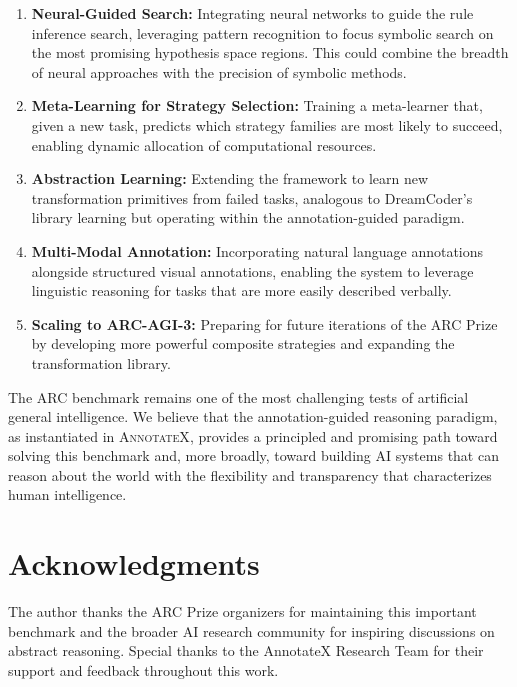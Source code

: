 \documentclass[conference,10pt,letterpaper]{IEEEtran}
\newcommand{\annotatexname}{\textsc{AnnotateX}}
\begin{document}
\begin{enumerate}[leftmargin=*,nosep]
    \item \textbf{Neural-Guided Search:} Integrating neural networks to guide the rule inference search, leveraging pattern recognition to focus symbolic search on the most promising hypothesis space regions. This could combine the breadth of neural approaches with the precision of symbolic methods.

    \item \textbf{Meta-Learning for Strategy Selection:} Training a meta-learner that, given a new task, predicts which strategy families are most likely to succeed, enabling dynamic allocation of computational resources.

    \item \textbf{Abstraction Learning:} Extending the framework to learn new transformation primitives from failed tasks, analogous to DreamCoder's library learning but operating within the annotation-guided paradigm.

    \item \textbf{Multi-Modal Annotation:} Incorporating natural language annotations alongside structured visual annotations, enabling the system to leverage linguistic reasoning for tasks that are more easily described verbally.

    \item \textbf{Scaling to ARC-AGI-3:} Preparing for future iterations of the ARC Prize by developing more powerful composite strategies and expanding the transformation library.
\end{enumerate}

The ARC benchmark remains one of the most challenging tests of artificial general intelligence. We believe that the annotation-guided reasoning paradigm, as instantiated in \annotatexname, provides a principled and promising path toward solving this benchmark and, more broadly, toward building AI systems that can reason about the world with the flexibility and transparency that characterizes human intelligence.

\section*{Acknowledgments}
The author thanks the ARC Prize organizers for maintaining this important benchmark and the broader AI research community for inspiring discussions on abstract reasoning. Special thanks to the AnnotateX Research Team for their support and feedback throughout this work.



\end{document}
